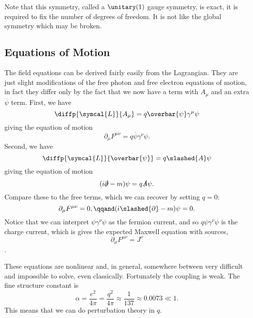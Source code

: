 \documentclass[fleqn]{NotesClass}
\newcommand{\lagrangianDensity}{\symcal{L}}
\newcommand{\diracadjoint}[1]{\overbar{#1}}
\begin{document}
    Note that this symmetry, called a \(\unitary(1)\) gauge symmetry, is exact, it is required to fix the number of degrees of freedom.
    It is not like the global symmetry which may be broken.
    
    \subsection{Equations of Motion}
    The field equations can be derived fairly easily from the Lagrangian.
    They are just slight modifications of the free photon and free electron equations of motion, in fact they differ only by the fact that we now have a term with \(A_\mu\) and an extra \(\diracadjoint{\psi}\) term.
    First, we have
    \begin{equation}
        \diffp{\lagrangianDensity}{A_\mu} = q\diracadjoint{\psi}\gamma^\mu\psi
    \end{equation}
    giving the equation of motion
    \begin{equation}
        \partial_\mu F^{\mu\nu} = q\diracadjoint{\psi}\gamma^\nu \psi.
    \end{equation}
    Second, we have
    \begin{equation}
        \diffp{\lagrangianDensity}{\diracadjoint{\psi}} = q\slashed{A}\psi
    \end{equation}
    giving the equation of motion
    \begin{equation}
        (i\slashed{\partial} - m)\psi = q\slashed{A}\psi.
    \end{equation}
    Compare these to the free terms, which we can recover by setting \(q = 0\):
    \begin{equation}
        \partial_\mu F^{\mu\nu} = 0, \qqand (i\slashed{\partial} - m)\psi = 0.
    \end{equation}
    Notice that we can interpret \(\psi\gamma^\nu\psi\) as the fermion current, and so \(q\psi\gamma^\nu\psi\) is the charge current, which is gives the expected Maxwell equation with sources,
    \begin{equation}
        \partial_\mu F^{\mu\nu} = J^\nu
    \end{equation}.
    
    These equations are nonlinear and, in general, somewhere between very difficult and impossible to solve, even classically.
    Fortunately the coupling is weak.
    The fine structure constant is
    \begin{equation}
        \alpha = \frac{e^2}{4\pi} = \frac{q^2}{4\pi} \approx \frac{1}{137} \approx 0.0073 \ll 1.
    \end{equation}
    This means that we can do perturbation theory in \(q\).
    
\end{document}
